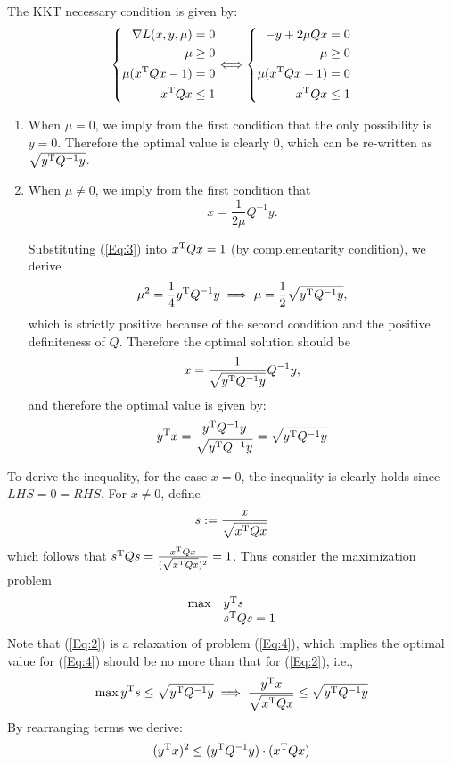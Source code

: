 \begin{enumerate}
The KKT necessary condition is given by:
\[
\left\{
\begin{aligned}
\nabla L(x,y,\mu)&=0\\
\mu&\ge0\\
\mu(x^{\mathrm T} Qx-1)&=0\\
x^{\mathrm T} Qx&\le1
\end{aligned}
\right.
\Longleftrightarrow
\left\{
\begin{aligned}
-y+2\mu Qx&=0\\
\mu&\ge0\\
\mu(x^{\mathrm T} Qx-1)&=0\\
x^{\mathrm T} Qx&\le1
\end{aligned}
\right.
\]
\begin{enumerate}
\item
When $\mu=0$, we imply from the first condition that the only possibility is $y=0$. Therefore the optimal value is clearly $0$, which can be re-written as $\sqrt{y^{\mathrm T} Q^{-1}y}$.
\item
When $\mu\ne0$, we imply from the first condition that 
\begin{equation}\label{Eq:3}
x=\frac{1}{2\mu}Q^{-1}y.
\end{equation}

Substituting (\ref{Eq:3}) into $x^{\mathrm T} Qx=1$ (by complementarity condition), we derive
\[
\mu^2=\frac{1}{4}y^{\mathrm T} Q^{-1}y\implies
\mu=\frac{1}{2}\sqrt{y^{\mathrm T} Q^{-1}y},
\]
which is strictly positive because of the second condition and the positive definiteness of $Q$. Therefore the optimal solution should be
\[
x=\frac{1}{\sqrt{y^{\mathrm T} Q^{-1}y}}Q^{-1}y,
\]
and therefore the optimal value is given by:
\[
y^{\mathrm T} x=\frac{y^{\mathrm T} Q^{-1}y}{\sqrt{y^{\mathrm T} Q^{-1}y}}=\sqrt{y^{\mathrm T} Q^{-1}y}
\]
\end{enumerate}
To derive the inequality, for the case $x=0$, the inequality is clearly holds since $LHS=0=RHS$. For $x\ne0$, define
\[
s:=\frac{x}{\sqrt{x^{\mathrm T} Qx}}
\]
which follows that $s^{\mathrm T} Qs=\frac{x^{\mathrm T} Qx}{(\sqrt{x^{\mathrm T} Qx})^2}=1$. Thus consider the maximization problem
\begin{equation}\label{Eq:4}
\begin{array}{ll}
\max&y^{\mathrm T} s\\
&s^{\mathrm T} Qs=1
\end{array}
\end{equation}
Note that (\ref{Eq:2}) is a relaxation of problem (\ref{Eq:4}), which implies the optimal value for (\ref{Eq:4}) should be no more than that for (\ref{Eq:2}), i.e.,
\[
\max y^{\mathrm T} s\le \sqrt{y^{\mathrm T} Q^{-1}y}\implies
\frac{y^{\mathrm T} x}{\sqrt{x^{\mathrm T} Qx}}\le \sqrt{y^{\mathrm T} Q^{-1}y}
\]
By rearranging terms we derive:
\[
(y^{\mathrm T} x)^2\le (y^{\mathrm T} Q^{-1}y)\cdot (x^{\mathrm T} Qx)
\]



\end{enumerate}












